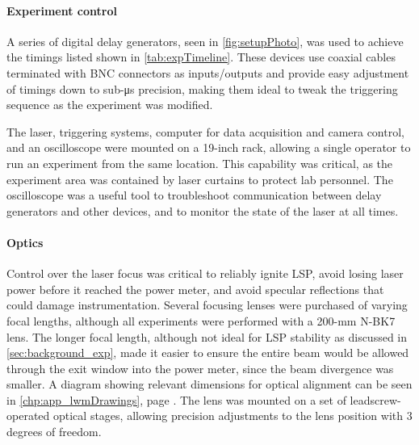 
                \paragraph{Experiment control} A series of digital delay generators, seen in \autoref{fig:setupPhoto}, was used to achieve the timings listed shown in \autoref{tab:expTimeline}. These devices use coaxial cables terminated with BNC connectors as inputs/outputs and provide easy adjustment of timings down to sub-\unit{\us} precision, making them ideal to tweak the triggering sequence as the experiment was modified.

                The laser, triggering systems, computer for data acquisition and camera control, and an oscilloscope were mounted on a 19-inch rack, allowing a single operator to run an experiment from the same location. This capability was critical, as the experiment area was contained by laser curtains to protect lab personnel. The oscilloscope was a useful tool to troubleshoot communication between delay generators and other devices, and to monitor the state of the laser at all times.

                \paragraph{Optics} Control over the laser focus was critical to reliably ignite LSP, avoid losing laser power before it reached the power meter, and avoid specular reflections that could damage instrumentation. Several focusing lenses were purchased of varying focal lengths, although all experiments were performed with a \num{200}-\unit{mm} N-BK7 lens. The longer focal length, although not ideal for LSP stability as discussed in \autoref{sec:background_exp}, made it easier to ensure the entire beam would be allowed through the exit window into the power meter, since the beam divergence was smaller. A diagram showing relevant dimensions for optical alignment can be seen in \autoref{chp:app_lwmDrawings}, page \pageref*{chp:app_optics}. The lens was mounted on a set of leadscrew-operated optical stages, allowing precision adjustments to the lens position with 3 degrees of freedom.

